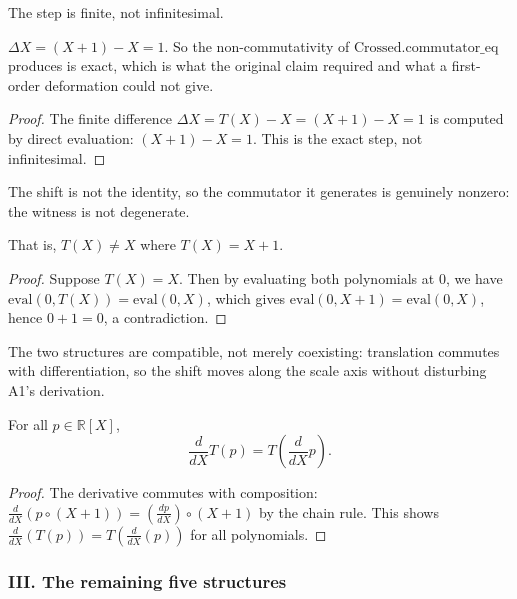 \begin{theorem}
\label{thm:shift_is_exact}
The step is finite, not infinitesimal. 

$\Delta X = (X+1) - X = 1$.  So the non-commutativity of $\text{Crossed.commutator\_eq}$
produces is exact, which is what the original claim required and what a
first-order deformation could not give.

\begin{proof}
The finite difference $\Delta X = T(X) - X = (X + 1) - X = 1$ is computed by
direct evaluation: $(X+1) - X = 1$. This is the exact step, not infinitesimal.
\end{proof}
\end{theorem}

\begin{theorem}
\label{thm:shift_nontrivial}
The shift is not the identity, so the commutator it generates is
genuinely nonzero: the witness is not degenerate. 

That is, $T(X) \neq X$ where $T(X) = X + 1$.

\begin{proof}
Suppose $T(X) = X$.  Then by evaluating both polynomials at $0$, we have
$\text{eval}(0, T(X)) = \text{eval}(0, X)$, which gives
$\text{eval}(0, X + 1) = \text{eval}(0, X)$, hence $0 + 1 = 0$, a contradiction.
\end{proof}
\end{theorem}

\begin{theorem}
\label{thm:shift_commutes_with_derivation}
The two structures are compatible, not merely coexisting: translation
commutes with differentiation, so the shift moves along the scale axis without
disturbing A1's derivation. 

For all $p \in \mathbb{R}[X]$,
\[
\frac{d}{dX} T(p) = T\left(\frac{d}{dX} p\right).
\]

\begin{proof}
The derivative commutes with composition: $\frac{d}{dX}(p \circ (X+1)) =
\left(\frac{dp}{dX}\right) \circ (X+1)$ by the chain rule. This shows
$\frac{d}{dX}(T(p)) = T\left(\frac{d}{dX}(p)\right)$ for all polynomials.
\end{proof}
\end{theorem}

\subsubsection*{III. The remaining five structures}

